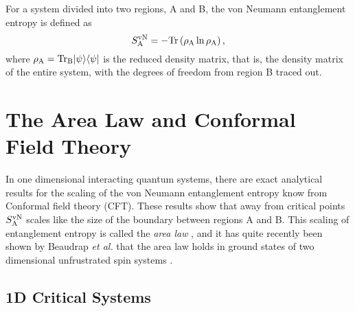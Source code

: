 For a system divided into two regions, A and B, the von Neumann entanglement entropy is defined as
\begin{equation}
	S^{\text{vN}}_\text{A} = -\rm{Tr}\left({\rho_A \ln \rho_A}\right),
\end{equation}
where $\rho_{\rm{A}}=\rm{Tr}_B\lvert {\psi} \rangle\langle {\psi} \rvert$ is the reduced density matrix, that is, the density matrix of the entire system, with the degrees of freedom from region B traced out.
\section{The Area Law and Conformal Field Theory}
In one dimensional interacting quantum systems, there are exact analytical results for the scaling of the von Neumann entanglement entropy know from Conformal field theory (CFT).
These results show that away from critical points $S^{\text{vN}}_\text{A}$ scales like the size of the boundary between regions A and B.  This scaling of entanglement entropy is called the {\it area law} \cite{Shredder}, and it has quite recently been shown by Beaudrap {\it et al.} that the area law holds in ground states of two dimensional unfrustrated spin systems \cite{DeBeaudrap2010}.




\subsection{1D Critical Systems}

\cite{Cardy} \cite{Zhou2006}






